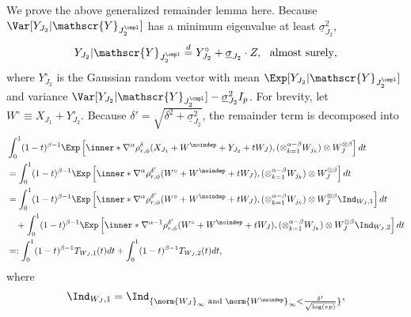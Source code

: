 \documentclass[aos]{imsart}
\begin{document}
\begin{appendix}
We prove the above generalized remainder lemma here. Because $\Var[Y_{J_2} | \mathscr{Y}_{J_2^\cmpl}]$ has a minimum eigenvalue at least $\underline{\sigma}_{J_2}^2$, 
\begin{equation*}
    Y_{J_2} | \mathscr{Y}_{J_2^\cmpl} \overset{d}{=} Y^\circ_{J_2} + \underline{\sigma}_{J_2} \cdot Z, ~~\text{almost surely},
\end{equation*}
where $Y^\circ_{J_2}$ is the Gaussian random vector with mean $\Exp[Y_{J_2}|\mathscr{Y}_{J_2^\cmpl}]$ and variance $\Var[Y_{J_2} | \mathscr{Y}_{J_2^\cmpl}] - \underline{\sigma}_{J_2}^2 I_p$.
For brevity, let $W^\circ \equiv X_{J_1} + Y^\circ_{J_2}$.
Because $\delta' = \sqrt{\delta^2 + \underline{\sigma}_{J_2}^2}$, the remainder term is decomposed into
\begin{equation*}
\begin{aligned}
    & \int_0^1 (1-t)^{\beta-1} \Exp\left[
        \inner*{\nabla^\alpha \rho_{r,\phi}^\delta(X_{J_1} + W^\noindep + Y_{J_2} + t W_J), (\otimes_{k=1}^{\alpha-\beta} W_{j_k}) \otimes W_J^{\otimes \beta}} 
    \right] dt \\
    & = \int_0^1 (1-t)^{\beta-1} \Exp\left[ 
        \inner*{\nabla^\alpha \rho_{r,\phi}^{\delta'} (W^\circ + W^\noindep + t W_J), (\otimes_{k=1}^{\alpha-\beta} W_{j_k}) \otimes W_J^{\otimes \beta}} 
    \right] dt \\
    & = \int_0^1 (1-t)^{\beta-1} \Exp\left[
        \inner*{\nabla^\alpha \rho_{r,\phi}^{\delta'} (W^\circ + W^\noindep + t W_J), (\otimes_{k=1}^{\alpha-\beta} W_{j_k}) \otimes W_J^{\otimes \beta}} \Ind_{W_J, 1}
    \right] dt \\
    & \quad + \int_0^1 (1-t)^{\beta-1} \Exp\left[
        \inner*{\nabla^{\alpha-1} \rho_{r,\phi}^{\delta'} (W^\circ + W^\noindep + t W_J), (\otimes_{k=1}^{\alpha-\beta} W_{j_k}) \otimes W_J^{\otimes \beta}}
        \Ind_{W_J,2}
    \right] dt \\
    & =: \int_0^1 (1-t)^{\beta-1} T_{W_J,1}(t) dt 
    + \int_0^1 (1-t)^{\beta-1} T_{W_J,2}(t) dt, %
\end{aligned}
\end{equation*}
where
\begin{equation*}
\begin{aligned}
    \Ind_{W_J,1} & = \Ind_{\{\norm{W_J}_\infty \text{ and } \norm{W^{\noindep}}_\infty < \frac{\delta'}{\sqrt{\log(ep)}}\}}, \\

\end{aligned}
\end{equation*}
\end{appendix}
\end{document}

